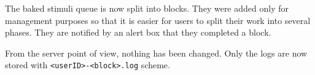 
The baked stimuli queue is now split into blocks. They were added only for management purposes so that it is easier for users to split their work into several phases. They are notified by an alert box that they completed a block.

From the server point of view, nothing has been changed. Only the logs are now stored with \texttt{<userID>-<block>.log} scheme.